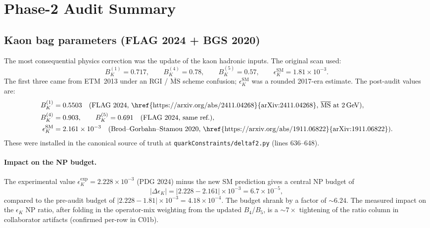 \documentclass[11pt]{article}
\newcommand{\eK}{\epsilon_K}
\newcommand{\DeK}{\Delta\eK}
\begin{document}
\section{Phase-2 Audit Summary}
\label{sec:audits}

\subsection{Kaon bag parameters (FLAG 2024 + BGS 2020)}
\label{sec:kaon-bags}

The most consequential physics correction was the update of the kaon
hadronic inputs.  The original scan used:
\[
  B_K^{(1)} = 0.717,\qquad
  B_K^{(4)} = 0.78,\qquad
  B_K^{(5)} = 0.57,\qquad
  \eK^{\mathrm{SM}} = 1.81\times10^{-3}.
\]
The first three came from ETM~2013 under an RGI / $\overline{\mathrm{MS}}$
scheme confusion; $\eK^{\mathrm{SM}}$ was a rounded 2017-era estimate.
The post-audit values are:
\begin{align}
  B_K^{(1)} &= 0.5503 \quad\text{(FLAG 2024,
    \href{https://arxiv.org/abs/2411.04268}{arXiv:2411.04268},
    $\overline{\mathrm{MS}}$ at 2\,GeV)},\label{eq:bk1}\\
  B_K^{(4)} &= 0.903,\qquad
  B_K^{(5)} = 0.691 \quad\text{(FLAG 2024, same ref.)},\\
  \eK^{\mathrm{SM}} &= 2.161\times10^{-3}
    \quad\text{(Brod--Gorbahn--Stamou 2020,
    \href{https://arxiv.org/abs/1911.06822}{arXiv:1911.06822})}.
\end{align}
These were installed in the canonical source of truth at
\texttt{quarkConstraints/deltaf2.py} (lines 636--648).

\paragraph{Impact on the NP budget.}
The experimental value $\eK^{\mathrm{exp}} = 2.228\times10^{-3}$
(PDG 2024) minus the new SM prediction gives a central NP budget of
\[
  |\DeK| = |2.228 - 2.161|\times10^{-3} = 6.7\times10^{-5},
\]
compared to the pre-audit budget of $|2.228 - 1.81|\times10^{-3} =
4.18\times10^{-4}$.  The budget shrank by a factor of $\sim\!6.24$.
The measured impact on the $\eK$ NP ratio, after folding in the
operator-mix weighting from the updated $B_4$/$B_5$, is a
$\sim\!7\times$ tightening of the ratio column in collaborator
artifacts (confirmed per-row in C01b).
\end{document}
